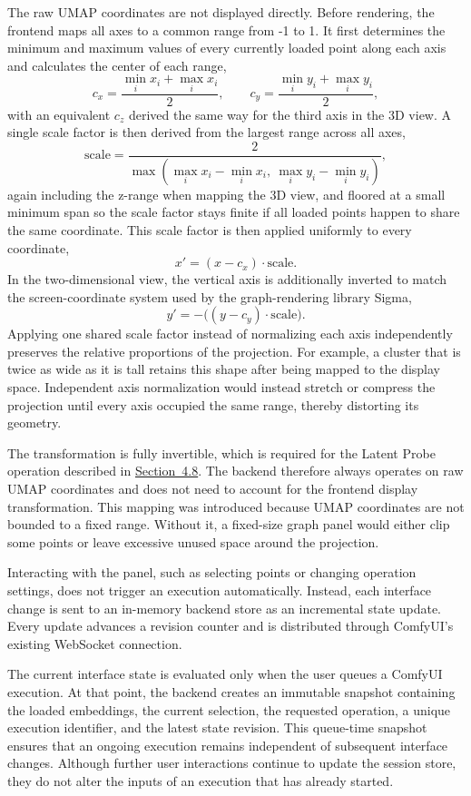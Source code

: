 The raw UMAP coordinates are not displayed directly. Before rendering, the frontend maps all axes to a common range from -1 to 1. It first determines the minimum and maximum values of every currently loaded point along each axis and calculates the center of each range,
\[
c_x = \frac{\min_i x_i + \max_i x_i}{2}, \qquad c_y = \frac{\min_i y_i + \max_i y_i}{2},
\]
with an equivalent $c_z$ derived the same way for the third axis in the 3D view. A single scale factor is then derived from the largest range across all axes,
\[
\mathrm{scale} = \frac{2}{\max\!\left(\max_i x_i - \min_i x_i,\ \max_i y_i - \min_i y_i\right)},
\]
again including the z-range when mapping the 3D view, and floored at a small minimum span so the scale factor stays finite if all loaded points happen to share the same coordinate. This scale factor is then applied uniformly to every coordinate,
\[
x' = (x - c_x) \cdot \mathrm{scale}.
\]
In the two-dimensional view, the vertical axis is additionally inverted to match the screen-coordinate system used by the graph-rendering library Sigma,
\[
y' = -\big((y - c_y) \cdot \mathrm{scale}\big).
\]
Applying one shared scale factor instead of normalizing each axis independently preserves the relative proportions of the projection. For example, a cluster that is twice as wide as it is tall retains this shape after being mapped to the display space. Independent axis normalization would instead stretch or compress the projection until every axis occupied the same range, thereby distorting its geometry.

The transformation is fully invertible, which is required for the Latent Probe operation described in \hyperref[sec:4.8]{Section~4.8}. The backend therefore always operates on raw UMAP coordinates and does not need to account for the frontend display transformation. This mapping was introduced because UMAP coordinates are not bounded to a fixed range. Without it, a fixed-size graph panel would either clip some points or leave excessive unused space around the projection.

Interacting with the panel, such as selecting points or changing operation settings, does not trigger an execution automatically. Instead, each interface change is sent to an in-memory backend store as an incremental state update. Every update advances a revision counter and is distributed through ComfyUI's existing WebSocket connection.

The current interface state is evaluated only when the user queues a ComfyUI execution. At that point, the backend creates an immutable snapshot containing the loaded embeddings, the current selection, the requested operation, a unique execution identifier, and the latest state revision. This queue-time snapshot ensures that an ongoing execution remains independent of subsequent interface changes. Although further user interactions continue to update the session store, they do not alter the inputs of an execution that has already started.

